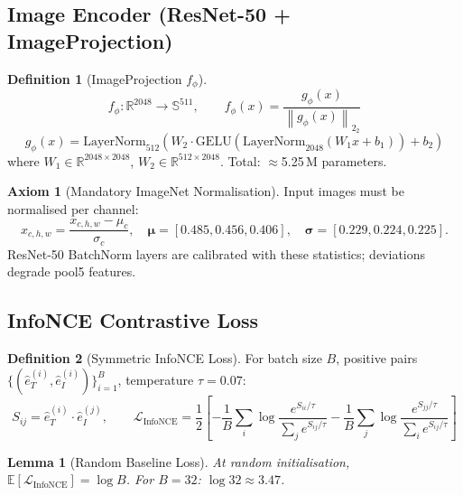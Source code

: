 \documentclass[12pt,a4paper]{article}
\theoremstyle{definition}
\newtheorem{definition}{Definition}[section]
\newtheorem{axiom}{Axiom}[section]
\theoremstyle{plain}
\newtheorem{lemma}[theorem]{Lemma}
\theoremstyle{remark}
\newcommand{\R}{\mathbb{R}}
\newcommand{\Sph}{\mathbb{S}}
\newcommand{\Norm}[1]{\left\|#1\right\|_2}
\newcommand{\LN}{\mathrm{LayerNorm}}
\newcommand{\GELU}{\mathrm{GELU}}
\begin{document}
\subsection{Image Encoder (ResNet-50 + ImageProjection)}

\begin{definition}[ImageProjection $f_\phi$]
\[
  f_\phi : \R^{2048} \to \Sph^{511}, \qquad
  f_\phi(x) = \frac{g_\phi(x)}{\Norm{g_\phi(x)}_2}
\]
\[
  g_\phi(x) = \LN_{512}\!\left(W_2 \cdot \GELU(\LN_{2048}(W_1 x + b_1)) + b_2\right)
\]
where $W_1 \in \R^{2048 \times 2048}$, $W_2 \in \R^{512 \times 2048}$. Total: $\approx$5.25\,M parameters.
\end{definition}

\begin{axiom}[Mandatory ImageNet Normalisation]
Input images must be normalised per channel:
\[
  \hat{x}_{c,h,w} = \frac{x_{c,h,w} - \mu_c}{\sigma_c}, \quad
  \bm{\mu} = [0.485, 0.456, 0.406], \quad \bm{\sigma} = [0.229, 0.224, 0.225].
\]
ResNet-50 BatchNorm layers are calibrated with these statistics; deviations degrade pool5 features.
\end{axiom}

\subsection{InfoNCE Contrastive Loss}

\begin{definition}[Symmetric InfoNCE Loss]
For batch size $B$, positive pairs $\{(\hat{e}_T^{(i)}, \hat{e}_I^{(i)})\}_{i=1}^B$, temperature $\tau = 0.07$:
\[
  S_{ij} = \hat{e}_T^{(i)} \cdot \hat{e}_I^{(j)}, \qquad
  \mathcal{L}_{\text{InfoNCE}} = \frac{1}{2}\left[
    -\frac{1}{B}\sum_i \log\frac{e^{S_{ii}/\tau}}{\sum_j e^{S_{ij}/\tau}}
    -\frac{1}{B}\sum_j \log\frac{e^{S_{jj}/\tau}}{\sum_i e^{S_{ij}/\tau}}
  \right]
\]
\end{definition}

\begin{lemma}[Random Baseline Loss]
At random initialisation, $\mathbb{E}[\mathcal{L}_{\text{InfoNCE}}] = \log B$. For $B = 32$: $\log 32 \approx 3.47$.
\end{lemma}
\end{document}
